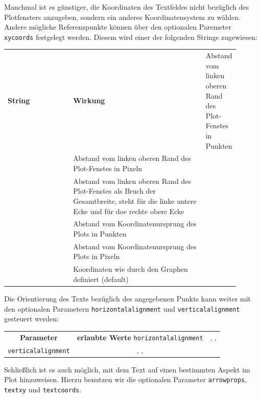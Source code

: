 Manchmal ist es günstiger, die Koordinaten des Textfeldes nicht bezüglich des Plotfensters anzugeben, sondern ein anderes Koordinatensystem zu wählen. Andere mögliche Referenzpunkte können über den optionalen Paremeter \texttt{xycoords} festgelegt werden. Diesem wird einer der folgenden Strings zugewiesen:
\begin{center}
\begin{tabular}{m{0.3\linewidth}m{0.6\linewidth}}
	\textbf{String}          & \textbf{Wirkung} \tabcrlf
	   & Abstand vom linken oberen Rand des Plot-Fenstes in Punkten \\
	   & Abstand vom linken oberen Rand des Plot-Fenstes in Pixeln \\
	 & Abstand vom linken oberen Rand des Plot-Fenstes als Bruch der Gesamtbreite, 
	                           \ie {} steht für die linke untere Ecke und  für doe rechte obere Ecke\\
	     & Abstand vom Koordinatenursprung des Plots in Punkten\\
	     & Abstand vom Koordinatenursprung des Plots in Pixeln\\
	            & Koordinaten wie durch den Graphen definiert (default)\\
\end{tabular}
\label{tab:plt.annotate.xycoords}
\end{center}

Die Orientierung des Texts bezüglich des angegebenen Punkts kann weiter mit den optionalen Parametern \texttt{horizontalalignment} und \texttt{verticalalignment} gesteuert werden:
\begin{center}
\begin{tabular}{cc}
	\textbf{Parameter}           & \textbf{erlaubte Werte} \tabcrlf
	\texttt{horizontalalignment} & , ,  \\
	\texttt{verticalalignment}   & , , 
\end{tabular}
\end{center}

Schließlich ist es auch möglich, mit dem Text auf einen bestimmten Aspekt im Plot hinzuweisen. Hierzu benutzen wir die optionalen Parameter \texttt{arrowprops}, \texttt{textxy} und \texttt{textcoords}.

